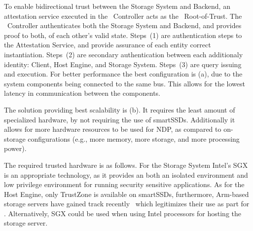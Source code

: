 To enable bidirectional trust between the Storage System and Backend, an attestation service executed in the \project{}~Controller acts as the \project{}~Root-of-Trust.
The \project{}~Controller authenticates both the Storage System and Backend, and provides proof to both, of each other's valid state.
Steps~(1) are authentication steps to the \project{} Attestation Service, and provide assurance of each entity correct instantiation.
Steps~(2) are secondary authentication between each additionaly identity: Client, Host Engine, and Storage System.
Steps~(3) are query issuing and execution.
\fi
For better performance the best configuration is (a), due to the system components being connected to the same bus. This allows for the lowest latency in communication between the  components.

The solution providing best scalability is (b). 
It requires the least amount of specialized hardware, by not requiring the use of smartSSDs.
Additionally it allows for more hardware resources to be used for NDP, as compared to on-storage configurations (e.g., more memory, more storage, and more processing power).

The required trusted hardware is as follows.
For the Storage System Intel's SGX is an appropriate technology, as it provides an both an isolated environment and low privilege environment for running security sensitive applications.
As for the Host Engine, only TrustZone is available on smartSSDs, furthermore, Arm-based storage servers have gained track recently~\cite{} which legitimizes their use as part for \project{}. Alternatively, SGX could be used when using Intel processors for hosting the storage server.
\fi

